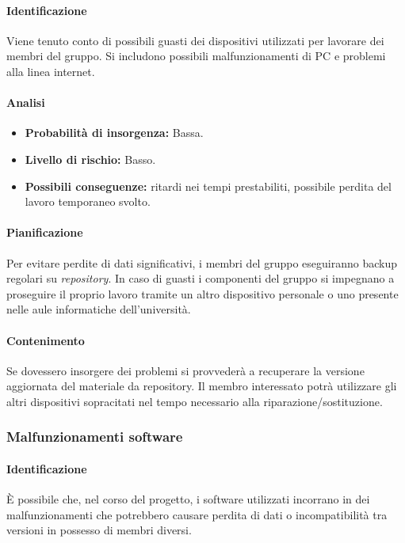\paragraph {Identificazione}
Viene tenuto conto di possibili guasti dei dispositivi utilizzati per lavorare dei membri del gruppo. Si includono possibili malfunzionamenti di PC e problemi alla linea internet.

\paragraph {Analisi}
\begin{itemize}
	\item \textbf{Probabilità di insorgenza:} Bassa.
	\item \textbf{Livello di rischio:} Basso.
	\item \textbf{Possibili conseguenze:} ritardi nei tempi prestabiliti, possibile perdita del lavoro temporaneo svolto.
\end{itemize}

\paragraph {Pianificazione}
Per evitare perdite di dati significativi, i membri del gruppo eseguiranno backup regolari su \emph{repository}. In caso di guasti i componenti del gruppo si impegnano a proseguire il proprio lavoro tramite un altro dispositivo personale o uno presente nelle aule informatiche dell'università.

\paragraph {Contenimento}
Se dovessero insorgere dei problemi si provvederà a recuperare la versione aggiornata del materiale da repository.	Il membro interessato potrà utilizzare gli altri dispositivi sopracitati nel tempo necessario alla riparazione/sostituzione.

\subsubsection{Malfunzionamenti software}
\paragraph {Identificazione}
È possibile che, nel corso del progetto, i software utilizzati incorrano in dei malfunzionamenti che potrebbero causare perdita di dati o incompatibilità tra versioni in possesso di membri diversi.

